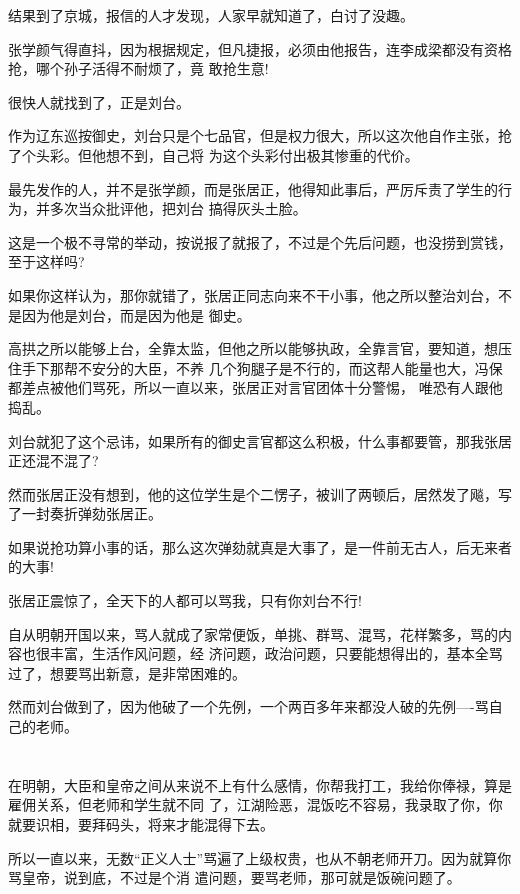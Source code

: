 \documentclass[11pt,a4paper,onecolumn]{article}
\begin{document}
结果到了京城，报信的人才发现，人家早就知道了，白讨了没趣。

张学颜气得直抖，因为根据规定，但凡捷报，必须由他报告，连李成梁都没有资格抢，哪个孙子活得不耐烦了，竟
敢抢生意!

很快人就找到了，正是刘台。

作为辽东巡按御史，刘台只是个七品官，但是权力很大，所以这次他自作主张，抢了个头彩。但他想不到，自己将
为这个头彩付出极其惨重的代价。

最先发作的人，并不是张学颜，而是张居正，他得知此事后，严厉斥责了学生的行为，并多次当众批评他，把刘台
搞得灰头土脸。

这是一个极不寻常的举动，按说报了就报了，不过是个先后问题，也没捞到赏钱，至于这样吗?

如果你这样认为，那你就错了，张居正同志向来不干小事，他之所以整治刘台，不是因为他是刘台，而是因为他是
御史。

高拱之所以能够上台，全靠太监，但他之所以能够执政，全靠言官，要知道，想压住手下那帮不安分的大臣，不养
几个狗腿子是不行的，而这帮人能量也大，冯保都差点被他们骂死，所以一直以来，张居正对言官团体十分警惕，
唯恐有人跟他捣乱。

刘台就犯了这个忌讳，如果所有的御史言官都这么积极，什么事都要管，那我张居正还混不混了?

然而张居正没有想到，他的这位学生是个二愣子，被训了两顿后，居然发了飚，写了一封奏折弹劾张居正。

如果说抢功算小事的话，那么这次弹劾就真是大事了，是一件前无古人，后无来者的大事!

张居正震惊了，全天下的人都可以骂我，只有你刘台不行!

自从明朝开国以来，骂人就成了家常便饭，单挑、群骂、混骂，花样繁多，骂的内容也很丰富，生活作风问题，经
济问题，政治问题，只要能想得出的，基本全骂过了，想要骂出新意，是非常困难的。

然而刘台做到了，因为他破了一个先例，一个两百多年来都没人破的先例----骂自己的老师。

\section[\thesection]{}

在明朝，大臣和皇帝之间从来说不上有什么感情，你帮我打工，我给你俸禄，算是雇佣关系，但老师和学生就不同
了，江湖险恶，混饭吃不容易，我录取了你，你就要识相，要拜码头，将来才能混得下去。

所以一直以来，无数``正义人士''骂遍了上级权贵，也从不朝老师开刀。因为就算你骂皇帝，说到底，不过是个消
遣问题，要骂老师，那可就是饭碗问题了。
\end{document}
